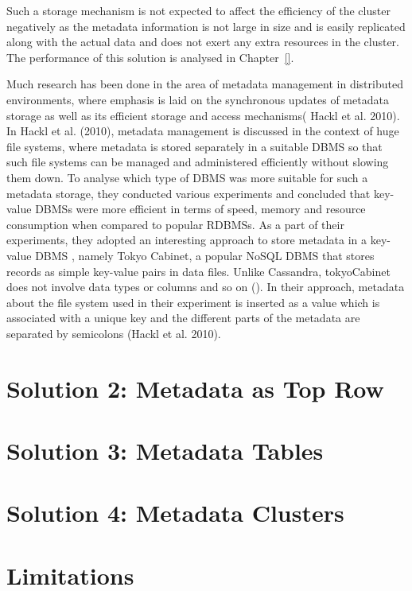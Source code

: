 	Such a storage mechanism is not expected to affect the efficiency of the
	cluster negatively as the metadata information is not large in size and is
	easily replicated along with the actual data and does not exert any extra
	resources in the cluster.  The performance of this solution is analysed  in
	Chapter~\ref{}.

	Much research has been done in the area of  metadata management in distributed
	environments,  where emphasis is laid on the synchronous updates of metadata
	storage as well as its efficient storage and access mechanisms(
	Hackl et al.  2010).
	In Hackl et al.  (2010),  metadata management is discussed in the context of
	huge file systems, where metadata is stored separately in a suitable \ac{DBMS}
	so that such file systems can be managed and administered efficiently without
	slowing them down.  To analyse which type of \ac{DBMS} was more suitable for such a
	metadata storage,  they conducted various experiments and concluded that
	key-value \acp{DBMS} were more efficient in terms of speed,  memory and resource
	consumption when compared to popular \acp{RDBMS}.  As a part of their
	experiments, they adopted an interesting approach to store metadata in a
	key-value \ac{DBMS} ,  namely Tokyo Cabinet,  a popular \ac{NoSQL} \ac{DBMS}
	that stores records as simple key-value pairs in data files. Unlike Cassandra,
	tokyoCabinet does not involve data types or columns
	and so on ().  In their approach,  metadata about the file system
	used in their experiment is inserted as a value which is associated with a unique key and the
	different parts of the metadata are separated by semicolons (Hackl et al.  2010).
	
\section{Solution 2:  Metadata as Top Row}\label{s:sol2}



\section{Solution 3:  Metadata Tables}\label{s:sol3}



\section{Solution 4:  Metadata Clusters}\label{s:sol4}

\section{Limitations}\label{s:lim}




